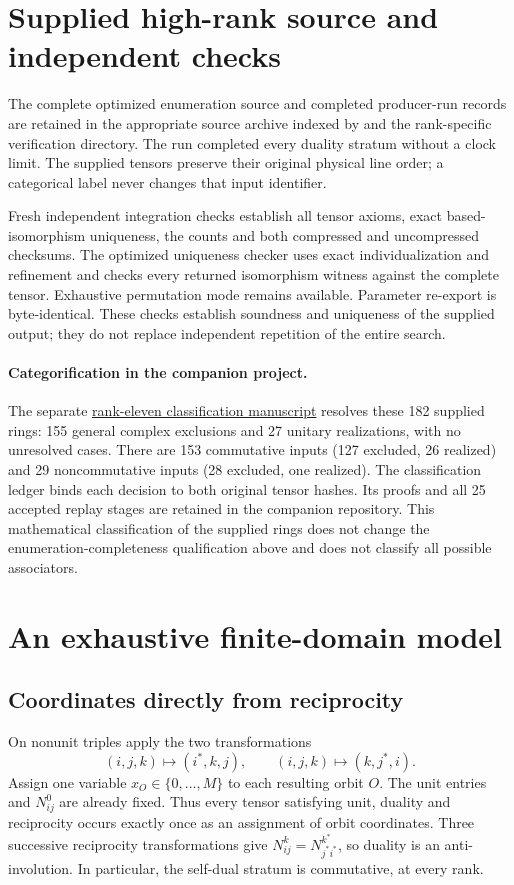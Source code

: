 \documentclass[11pt,a4paper]{article}
\theoremstyle{definition}\newtheorem{definition}[theorem]{Definition}\newtheorem{remark}[theorem]{Remark}
\begin{document}
\section{Supplied high-rank source and independent checks}
The complete optimized enumeration source and completed producer-run records
are retained in the appropriate source archive indexed by  and the rank-specific
verification directory. The run completed every duality stratum without a
clock limit. The supplied tensors preserve their original physical line
order; a categorical label never changes that input identifier.

Fresh independent integration checks establish all tensor axioms, exact
based-isomorphism uniqueness, the counts and both compressed and uncompressed
checksums. The optimized uniqueness checker uses exact individualization and
refinement and checks every returned isomorphism witness against the complete
tensor. Exhaustive permutation mode remains available. Parameter re-export is
byte-identical. These checks establish soundness and uniqueness of the supplied
output; they do not replace independent repetition of the entire search.
\paragraph{Categorification in the companion project.}
The separate
\href{https://github.com/sebastienpalcoux/grothendieck-ring-classification/tree/main/publications/rank11}{rank-eleven classification manuscript}
resolves these 182 supplied rings: 155 general complex exclusions and 27
unitary realizations, with no unresolved cases. There are 153 commutative
inputs (127 excluded, 26 realized) and 29 noncommutative inputs (28 excluded,
one realized). The classification ledger binds each decision to both original
tensor hashes. Its proofs and all 25 accepted replay stages are retained in
the companion repository. This mathematical classification of the supplied
rings does not change the enumeration-completeness qualification above and
does not classify all possible associators.

\section{An exhaustive finite-domain model}
\subsection{Coordinates directly from reciprocity}
On nonunit triples apply the two transformations
\[
(i,j,k)\longmapsto(i^*,k,j),\qquad
(i,j,k)\longmapsto(k,j^*,i).
\]
Assign one variable $x_O\in\{0,\ldots,M\}$ to each resulting orbit $O$.
The unit entries and $N_{ij}^0$ are already fixed. Thus every tensor satisfying
unit, duality and reciprocity occurs exactly once as an assignment of orbit
coordinates. Three successive reciprocity transformations give
$N_{ij}^{k}=N_{j^*i^*}^{k^*}$, so duality is an anti-involution. In particular,
the self-dual stratum is commutative, at every rank.
\end{document}
